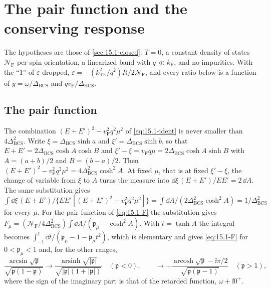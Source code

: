 \section[Pair function and conserving response]{The pair function and the conserving response}\label{app:D.39}

The hypotheses are those of \cref{sec:15.1-closed}: $T = 0$, a constant density of states $\mathcal{N}_{\mathrm{F}}$ per spin orientation, a linearized band with $q \ll k_{\mathrm{F}}$, and no impurities. With the ``1'' of $\varepsilon$ dropped, $\varepsilon = -(k_{\mathrm{TF}}^2/q^2)R/2\mathcal{N}_{\mathrm{F}}$, and every ratio below is a function of $y = \omega/\Delta_{\mathrm{BCS}}$ and $qv_{\mathrm{F}}/\Delta_{\mathrm{BCS}}$.

\subsection*{The pair function}

The combination $(E + E')^2 - v_{\mathrm{F}}^2q^2\mu^2$ of \cref{eq:15.1-ident} is never smaller than $4\Delta_{\mathrm{BCS}}^2$. Write $\xi = \Delta_{\mathrm{BCS}}\sinh a$ and $\xi' = \Delta_{\mathrm{BCS}}\sinh b$, so that $E + E' = 2\Delta_{\mathrm{BCS}}\cosh A\cosh B$ and $\xi' - \xi = v_{\mathrm{F}}q\mu = 2\Delta_{\mathrm{BCS}}\cosh A\sinh B$ with $A = (a + b)/2$ and $B = (b - a)/2$. Then $(E + E')^2 - v_{\mathrm{F}}^2q^2\mu^2 = 4\Delta_{\mathrm{BCS}}^2\cosh^2A$. At fixed $\mu$, that is at fixed $\xi' - \xi$, the change of variable from $\xi$ to $A$ turns the measure into $\dd\xi\,(E + E')/EE' = 2\,\dd A$. The same substitution gives $\int\dd\xi\,(E + E')/\{EE'[(E + E')^2 - v_{\mathrm{F}}^2q^2\mu^2]\} = \int\dd A/(2\Delta_{\mathrm{BCS}}^2\cosh^2A) = 1/\Delta_{\mathrm{BCS}}^2$ for every $\mu$. For the pair function of \cref{eq:15.1-F} the substitution gives $F_\mu = (\mathcal{N}_{\mathrm{F}}/4\Delta_{\mathrm{BCS}}^2)\int\dd A/(\mathfrak{p}_\mu - \cosh^2A)$. With $t = \tanh A$ the integral becomes $\int_{-1}^1\dd t/(\mathfrak{p}_\mu - 1 - \mathfrak{p}_\mu t^2)$, which is elementary and gives \cref{eq:15.1-F} for $0 < \mathfrak{p}_\mu < 1$ and, for the other ranges,
\begin{equation}
  \frac{\arcsin\sqrt{\mathfrak{p}}}{\sqrt{\mathfrak{p}(1 - \mathfrak{p})}} \to
  \frac{\operatorname{arsinh}\sqrt{|\mathfrak{p}|}}{\sqrt{|\mathfrak{p}|(1 + |\mathfrak{p}|)}}\quad(\mathfrak{p} < 0), \qquad
  \to -\frac{\operatorname{arcosh}\sqrt{\mathfrak{p}} - \ii\pi/2}{\sqrt{\mathfrak{p}(\mathfrak{p} - 1)}}\quad(\mathfrak{p} > 1) ,
  \label{eq:D.39-Fcont}
\end{equation}
where the sign of the imaginary part is that of the retarded function, $\omega + \ii0^+$.


